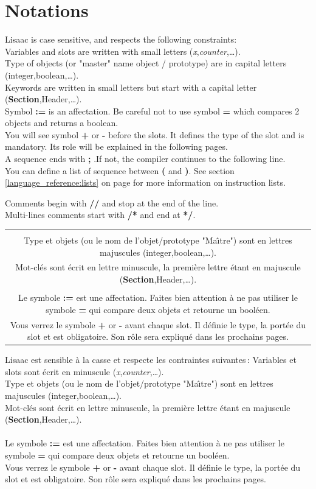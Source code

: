 \documentclass[11pt]{mybook}
\newcommand{\fr}[1]{
  \if \frenchversion 1
    \if \englishversion 1    
    \vspace{2mm}
    \noindent\begin{tabular}{|c}
      {
        \begin{minipage}{15.5cm}
          \textit{#1}
        \end{minipage}
      }
    \end{tabular}
    \else
    #1
    \fi
  \fi
}
\newcommand{\en}[1]
{
  \if \englishversion 1
  #1
  \fi
}
\begin{document}
\section{Notations}
\label{quickstart:notations}
%
\en{Lisaac is case sensitive, and respects the following constraints:\\
Variables and slots are written with small letters ({\it{}x},{\it{}counter},\ldots).\\
Type of objects (or "master" name object / prototype) are in capital letters ({\sc{}integer},{\sc{}boolean},\ldots).\\
Keywords are written in small letters but start with a capital letter ({\bf{}Section},Header,\ldots).\\

Symbol {\bf{} :=} is an affectation. Be careful not to use symbol {\bf{} =} which compares 2 objects and returns a boolean.\\
You will see symbol {\bf{} +} or {\bf{} -} before the slots. It defines the type of the slot and is mandatory. Its role will be explained in the following pages.\\

A sequence ends with {\bf{} ;} .If not, the compiler continues to the following line.\\
You can define a list of sequence between {\bf{} (} and {\bf{} )}.
See section \ref{language_reference:lists} on page \pageref{language_reference:lists} for more information on instruction lists.

Comments begin with {\bf{} //} and stop at the end of the line.\\
Multi-lines comments start with {\bf{} /*} and end at {\bf{} */}.
}

\fr{
Lisaac est sensible \`a la casse et respecte les contraintes suivantes\,:
Variables et slots sont \'ecrit en minuscule ({\it{}x},{\it{}counter},\ldots).\\
Type et objets (ou le nom de l'objet/prototype "Ma\^\i tre") sont en lettres majuscules ({\sc{}integer},{\sc{}boolean},\ldots).\\
Mot-cl\'es sont \'ecrit en lettre minuscule, la premi\`ere lettre \'etant en majuscule  ({\bf{}Section},Header,\ldots).\\
\\
Le symbole {\bf{} :=} est une affectation. Faites bien attention \`a ne pas utiliser le symbole {\bf{} =} qui compare deux objets et retourne un bool\'een.\\
Vous verrez le symbole  {\bf{} +} or {\bf{} -} avant chaque slot. Il d\'efinie le type, la port\'ee du slot et est obligatoire. 
Son r\^ole sera expliqu\'e dans les prochains pages.
}
\end{document}
